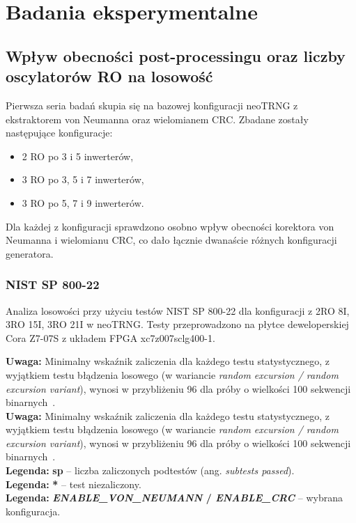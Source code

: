 
\chapter{Badania eksperymentalne}

\section{Wpływ obecności post-processingu oraz liczby oscylatorów RO na losowość}

\noindent Pierwsza seria badań skupia się na bazowej konfiguracji neoTRNG z ekstraktorem von 
Neumanna oraz wielomianem CRC. Zbadane zostały następujące konfiguracje:

\begin{itemize}
    \item 2 RO po 3 i 5 inwerterów, 
    \item 3 RO po 3, 5 i 7 inwerterów,
    \item 3 RO po 5, 7 i 9 inwerterów.
\end{itemize}

Dla każdej z konfiguracji sprawdzono osobno wpływ obecności korektora von Neumanna i 
wielomianu CRC, co dało łącznie dwanaście różnych konfiguracji generatora. 


\subsection{NIST SP 800-22}

Analiza losowości przy użyciu testów NIST SP 800-22 dla konfiguracji z 2RO 8I, 
3RO 15I, 3RO 21I w neoTRNG. Testy przeprowadzono na płytce deweloperskiej 
Cora Z7-07S z układem FPGA xc7z007sclg400-1.


\begin{flushleft}
\small \textbf{Uwaga:} Minimalny wskaźnik zaliczenia dla każdego testu statystycznego, 
z wyjątkiem testu błądzenia losowego 
(w wariancie \textit{random excursion / random excursion variant}), wynosi w 
przybliżeniu 96 dla próby o wielkości 100 sekwencji binarnych~\cite{NIST-SP-800-22}. \\
\small \textbf{Uwaga:} Minimalny wskaźnik zaliczenia dla każdego testu statystycznego, 
z wyjątkiem testu błądzenia losowego 
(w wariancie \textit{random excursion / random excursion variant}), wynosi w 
przybliżeniu 96 dla próby o wielkości 100 sekwencji binarnych~\cite{NIST-SP-800-22}. \\
\small \textbf{Legenda:} \textbf{sp} -- liczba zaliczonych podtestów (ang. \textit{subtests passed}). \\
\small \textbf{Legenda:} \textbf{*} -- test niezaliczony. \\
\small \textbf{Legenda:} \textbf{\textit{ENABLE\_VON\_NEUMANN} / \textit{ENABLE\_CRC}} – wybrana konfiguracja.
\end{flushleft}



